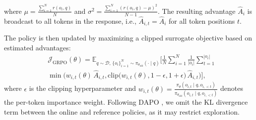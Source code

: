 where $\mu = \frac{\sum_{i=1}^{N} r(o_i, q)}{N}$ and $\sigma^2 = \frac{\sum_{i=1}^{N} \left(r(o_i, q) - \mu\right)^2}{N-1}$.
The resulting advantage $\hat{A}_i$ is broadcast to all tokens in the response, i.e., $\hat{A}_{i,t} = \hat{A}_i$ for all token positions $t$.

The policy is then updated by maximizing a clipped surrogate objective based on estimated advantages:
\begin{equation}
\label{eq:grpo}
\begin{aligned}
&\mathcal{J}_{\mathrm{GRPO}}(\theta)
=
\mathbb{E}_{q \sim \mathcal{D},\, \{o_i\}_{i=1}^{N} \sim \pi_{\theta_{\mathrm{old}}}(\cdot \mid q)}
\Bigg[
\frac{1}{N}
\sum_{i=1}^{N}
\frac{1}{|o_i|}
\sum_{t=1}^{|o_i|}\\
&\min \Big(
w_{i,t}(\theta)\, \hat{A}_{i,t},
\mathrm{clip}\!\big(w_{i,t}(\theta), 1-\epsilon, 1+\epsilon\big)\, \hat{A}_{i,t}
\Big)
\Bigg],
\end{aligned}
\end{equation}
where $\epsilon$ is the clipping hyperparameter and 
$w_{i,t}(\theta)=\frac{\pi_\theta(o_{i,t} \mid q, o_{i,<t})}{\pi_{\theta_{\mathrm{old}}}(o_{i,t} \mid q, o_{i,<t})}$ denotes the per-token importance weight. Following DAPO \cite{yu2025dapoopensourcellmreinforcement}, we omit the KL divergence term between the online and reference policies, as it may restrict exploration.
